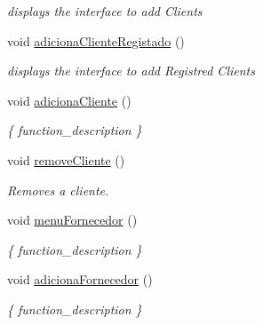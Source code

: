 \begin{DoxyCompactItemize}
\begin{DoxyCompactList}\small\item\em displays the interface to add Clients \end{DoxyCompactList}\item 
\mbox{\label{classEmpresa_a430c00a63ef70338de3b4b7c096ea194}} 
void \hyperlink{classEmpresa_a430c00a63ef70338de3b4b7c096ea194}{adiciona\+Cliente\+Registado} ()
\begin{DoxyCompactList}\small\item\em displays the interface to add Registred Clients \end{DoxyCompactList}\item 
\mbox{\label{classEmpresa_aba4af6a945948ac66e771a416cfc2a2a}} 
void \hyperlink{classEmpresa_aba4af6a945948ac66e771a416cfc2a2a}{adiciona\+Cliente} ()
\begin{DoxyCompactList}\small\item\em \{ function\+\_\+description \} \end{DoxyCompactList}\item 
\mbox{\label{classEmpresa_ab9af9446d6d2c206b4b3e18e1bcb6475}} 
void \hyperlink{classEmpresa_ab9af9446d6d2c206b4b3e18e1bcb6475}{remove\+Cliente} ()
\begin{DoxyCompactList}\small\item\em Removes a cliente. \end{DoxyCompactList}\item 
\mbox{\label{classEmpresa_adb9d8d4aa55f253fc534e220ca4a87ac}} 
void \hyperlink{classEmpresa_adb9d8d4aa55f253fc534e220ca4a87ac}{menu\+Fornecedor} ()
\begin{DoxyCompactList}\small\item\em \{ function\+\_\+description \} \end{DoxyCompactList}\item 
\mbox{\label{classEmpresa_af20261a3f95a5dd0c4a5a796d9a3d442}} 
void \hyperlink{classEmpresa_af20261a3f95a5dd0c4a5a796d9a3d442}{adiciona\+Fornecedor} ()
\begin{DoxyCompactList}\small\item\em \{ function\+\_\+description \} \end{DoxyCompactList}\item 

\end{DoxyCompactItemize}
